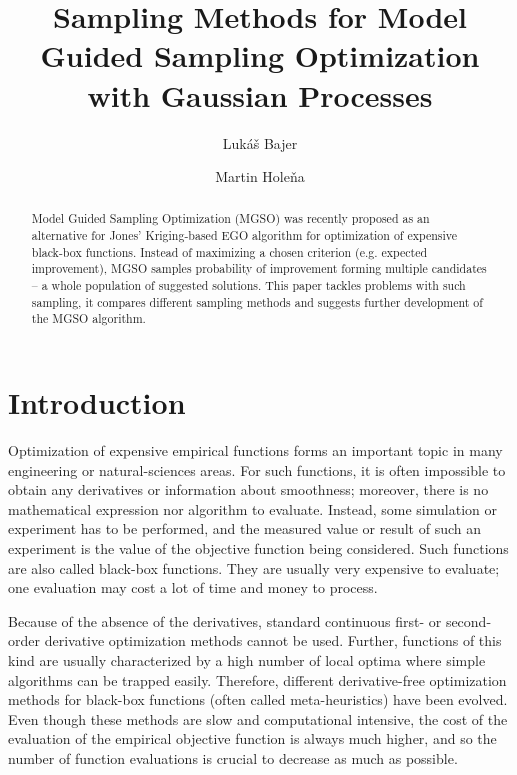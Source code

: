 \documentclass{itatnew}
\begin{document}
\title{Sampling Methods for Model Guided Sampling Optimization
  with Gaussian Processes}

\author{Lukáš Bajer \and Martin Holeňa}


\maketitle              %

\begin{abstract}
Model Guided Sampling Optimization (MGSO) was recently proposed as an alternative for Jones' Kriging-based EGO algorithm for optimization of expensive black-box functions. Instead of maximizing a chosen criterion (e.g. expected improvement), MGSO samples probability of improvement forming multiple candidates -- a whole population of suggested solutions. This paper tackles problems with such sampling, it compares different sampling methods and suggests further development of the MGSO algorithm.
\end{abstract}

\section{Introduction}
%
Optimization of expensive empirical functions forms an important topic in many engineering or natural-sciences areas. For such functions, it is often impossible to obtain any derivatives or information about smoothness; moreover, there is no mathematical expression nor algorithm to evaluate. Instead, some simulation or experiment has to be performed, and the measured value or result of such an experiment is the value of the objective function being considered. Such functions are also called black-box functions. 
They are usually very expensive to evaluate; one evaluation may cost a lot of time and money to process.

Because of the absence of the derivatives, standard continuous first- or second-order derivative optimization methods cannot be used. Further, functions of this kind are usually characterized by a high number of local optima where simple algorithms can be trapped easily. Therefore, different derivative-free optimization methods for black-box functions (often called meta-heuristics) have been evolved. Even though these methods are slow and computational intensive, the cost of the evaluation of the empirical objective function is always much higher, and so the number of function evaluations is crucial to decrease as much as possible.
\end{document}
